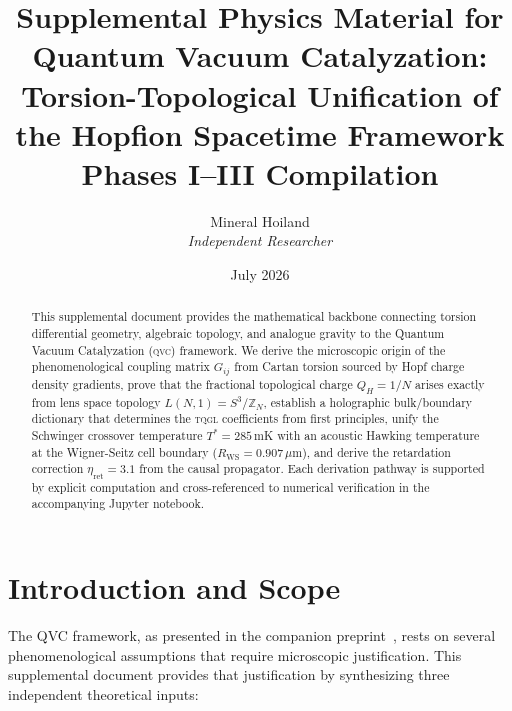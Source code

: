 \documentclass[11pt,letterpaper]{article}
\newcommand{\QVC}{\textsc{qvc}}
\newcommand{\TQGL}{\textsc{tqgl}}
\begin{document}
\title{\textbf{Supplemental Physics Material for Quantum Vacuum Catalyzation:}\\
\large Torsion-Topological Unification of the Hopfion Spacetime Framework\\[4pt]
\normalsize Phases I--III Compilation}

\author{Mineral Hoiland\\
\textit{Independent Researcher}}

\date{July 2026}

\maketitle

\begin{abstract}
This supplemental document provides the mathematical backbone connecting torsion differential geometry, algebraic topology, and analogue gravity to the Quantum Vacuum Catalyzation (\QVC) framework. We derive the microscopic origin of the phenomenological coupling matrix $G_{ij}$ from Cartan torsion sourced by Hopf charge density gradients, prove that the fractional topological charge $Q_H = 1/N$ arises exactly from lens space topology $L(N,1) = S^3/\mathbb{Z}_N$, establish a holographic bulk/boundary dictionary that determines the \TQGL{} coefficients from first principles, unify the Schwinger crossover temperature $T^* = 285$\,mK with an acoustic Hawking temperature at the Wigner-Seitz cell boundary ($R_{\text{WS}} = 0.907\,\mu$m), and derive the retardation correction $\eta_{\text{ret}} = 3.1$ from the causal propagator. Each derivation pathway is supported by explicit computation and cross-referenced to numerical verification in the accompanying Jupyter notebook.
\end{abstract}

\tableofcontents
\newpage

\section{Introduction and Scope}
\label{sec:intro}

The QVC framework, as presented in the companion preprint~\cite{Hoiland2026}, rests on several phenomenological assumptions that require microscopic justification. This supplemental document provides that justification by synthesizing three independent theoretical inputs:
\end{document}
